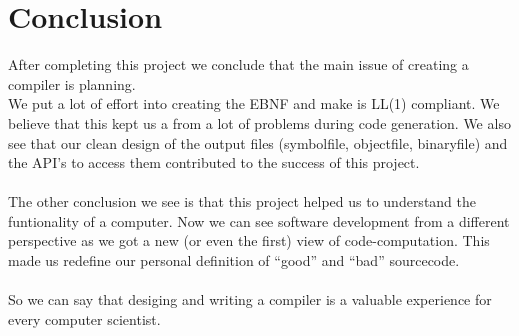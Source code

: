 \part{Conclusion}
\label{conclusion}
After completing this project we conclude that the main issue of creating a
compiler is planning. \\
We put a lot of effort into creating the EBNF and make is LL(1) compliant. We
believe that this kept us a from a lot of problems during code generation. We
also see that our clean design of the output files (symbolfile, objectfile,
binaryfile) and the API's to access them contributed to the success of this project.
\\ \\
The other conclusion we see is that this project helped us to understand the
funtionality of a computer. Now we can see software development from a different
perspective as we got a new (or even the first) view of code-computation. This
made us redefine our personal definition of ``good'' and ``bad'' sourcecode. 
\\ \\
So we can say that desiging and writing a compiler is a valuable experience for
every computer scientist.  
